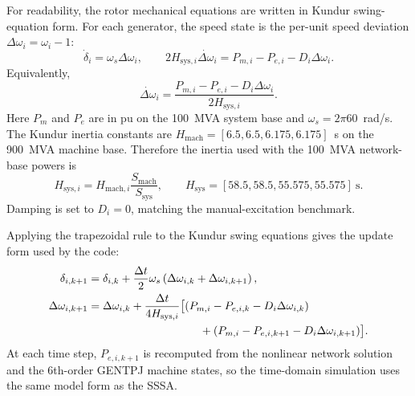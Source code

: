 \documentclass[12pt,a4paper]{article}
\begin{document}
For readability, the rotor mechanical equations are written in Kundur swing-
equation form. For each generator, the speed state is the per-unit speed
deviation $\Delta\omega_i=\omega_i-1$:
\begin{equation}
    \dot{\delta}_i=\omega_s\Delta\omega_i,
    \qquad
    2H_{\mathrm{sys},i}\dot{\Delta\omega}_i
    = P_{m,i}-P_{e,i}-D_i\Delta\omega_i .
    \label{eq:swing_psat}
\end{equation}
Equivalently,
\begin{equation}
    \dot{\Delta\omega}_i
    =\frac{P_{m,i}-P_{e,i}-D_i\Delta\omega_i}{2H_{\mathrm{sys},i}}.
\end{equation}
Here $P_m$ and $P_e$ are in pu on the 100~MVA system base and
$\omega_s=2\pi60$~rad/s. The Kundur inertia constants are
$H_{\mathrm{mach}}=[6.5,6.5,6.175,6.175]$~s on the 900~MVA machine base.
Therefore the inertia used with the 100~MVA network-base powers is
\begin{equation}
    H_{\mathrm{sys},i}=H_{\mathrm{mach},i}
    \frac{S_{\mathrm{mach}}}{S_{\mathrm{sys}}},
    \qquad
    H_{\mathrm{sys}}=[58.5,58.5,55.575,55.575]~\mathrm{s}.
    \label{eq:h_conversion}
\end{equation}
Damping is set to $D_i=0$, matching the manual-excitation benchmark.

Applying the trapezoidal rule to the Kundur swing equations gives the update
form used by the code:
\begin{align}
    \delta_{i,k+1} &= \delta_{i,k}
       +\frac{\Delta t}{2}\omega_s
       \left(\Delta\omega_{i,k}+\Delta\omega_{i,k+1}\right), \\
    \Delta\omega_{i,k+1} &= \Delta\omega_{i,k}
       +\frac{\Delta t}{4H_{\mathrm{sys},i}}\bigl[
       (P_{m,i}-P_{e,i,k}-D_i\Delta\omega_{i,k}) \\
       &\hspace{35mm}+
       (P_{m,i}-P_{e,i,k+1}-D_i\Delta\omega_{i,k+1})
       \bigr].
    \label{eq:trap_kundur_form}
\end{align}
At each time step, $P_{e,i,k+1}$ is recomputed from the nonlinear network
solution and the 6th-order GENTPJ machine states, so the time-domain simulation
uses the same model form as the SSSA.
\end{document}
